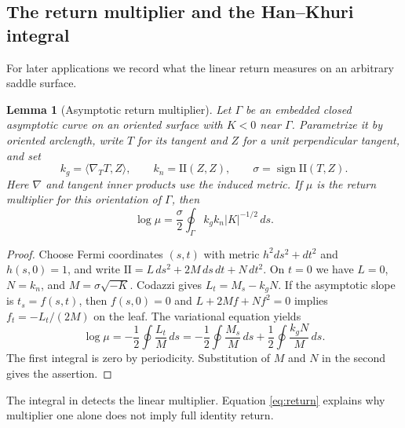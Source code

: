\documentclass[11pt]{amsart}
\newtheorem{lemma}[theorem]{Lemma}
\theoremstyle{definition}
\theoremstyle{remark}
\newcommand{\II}{\mathrm{II}}\newcommand{\Gmap}{\mathcal G}
\numberwithin{equation}{section}
\begin{document}
\subsection{The return multiplier and the Han--Khuri integral}
For later applications we record what the linear return measures on an
arbitrary saddle surface.
\begin{lemma}[Asymptotic return multiplier]\label{lem:holonomy-integral-new}
Let $\Gamma$ be an embedded closed asymptotic curve on an oriented
surface with $K<0$ near $\Gamma$. Parametrize it by oriented arclength,
write $T$ for its tangent and $Z$ for a unit perpendicular tangent, and set
\[
 k_g=\langle\nabla_TT,Z\rangle,\qquad k_n=\II(Z,Z),\qquad
 \sigma=\operatorname{sign}\II(T,Z).
\]
Here $\nabla$ and tangent inner products use the induced metric.
If $\mu$ is the return multiplier for this orientation of $\Gamma$, then
\begin{equation}\label{eq:holonomy-integral-new}
 \log\mu=\frac\sigma2\oint_\Gamma k_gk_n|K|^{-1/2}\,ds.
\end{equation}
\end{lemma}
\begin{proof}
Choose Fermi coordinates $(s,t)$ with metric $h^2ds^2+dt^2$ and
$h(s,0)=1$, and write $\II=L\,ds^2+2M\,ds\,dt+N\,dt^2$.
On $t=0$ we have $L=0$, $N=k_n$, and $M=\sigma\sqrt{-K}$.
Codazzi gives $L_t=M_s-k_gN$. If the asymptotic slope is $t_s=f(s,t)$,
then $f(s,0)=0$ and $L+2Mf+Nf^2=0$ implies $f_t=-L_t/(2M)$ on the
leaf. The variational equation yields
\[
 \log\mu=-\frac12\oint\frac{L_t}{M}\,ds
 =-\frac12\oint\frac{M_s}{M}\,ds+
   \frac12\oint\frac{k_gN}{M}\,ds.
\]
The first integral is zero by periodicity. Substitution of $M$ and $N$
in the second gives the assertion.
\end{proof}
The integral in \cite{HK} detects the linear multiplier. Equation
\eqref{eq:return} explains why multiplier one alone does not imply full
identity return.
\end{document}
